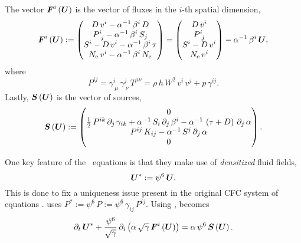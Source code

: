 The vector $\boldsymbol{F}^{i}\left(\boldsymbol{U}\right)$
is the vector of fluxes in the $i$-th spatial dimension,
\begin{equation}
  \boldsymbol{F}^{i}\left(\boldsymbol{U}\right)
  :=\begin{pmatrix}
  D\,v^{i}-\alpha^{-1}\,\beta^{i}\,D\\
  P^{i}_{~j}-\alpha^{-1}\,\beta^{i}\,S_{j}\\
  S^{i}-D\,v^{i}-\alpha^{-1}\,\beta^{i}\,\tau\\
  N_{\mathrm{e}}\,v^{i}-\alpha^{-1}\,\beta^{i}\,N_{\mathrm{e}}
  \end{pmatrix}
  =\begin{pmatrix}
  D\,v^{i}\\
  P^{i}_{~j}\\
  S^{i}-D\,v^{i}\\
  N_{\mathrm{e}}\,v^{i}
  \end{pmatrix}
  -\alpha^{-1}\,\beta^{i}\,\boldsymbol{U},
\end{equation}
where
\begin{equation}
  P^{ij}=\gamma^{i}_{~\mu}\,\gamma^{j}_{~\nu}\,T^{\mu\nu}
  =\rho\,h\,W^{2}\,v^{i}\,v^{j}+p\,\gamma^{ij}.
\end{equation}
Lastly, $\boldsymbol{S}\left(\boldsymbol{U}\right)$ is the vector of sources,
\begin{equation}
  \boldsymbol{S}\left(\boldsymbol{U}\right)
  :=\begin{pmatrix}
  0\\
  \frac{1}{2}\,P^{ik}\,\partial_{j}\,\gamma_{ik}
  +\alpha^{-1}\,S_{i}\,\partial_{j}\,\beta^{i}
  -\alpha^{-1}\,\left(\tau+D\right)\,\partial_{j}\,\alpha\\
  P^{ij}\,K_{ij}-\alpha^{-1}\,S^{j}\,\partial_{j}\,\alpha\\
  0
  \end{pmatrix}.
\end{equation}

One key feature of the \xcfc\ equations is that they make use of
{\sl densitized} fluid fields,
\begin{equation}
  \boldsymbol{U}^{*}:=\psi^{6}\,\boldsymbol{U}.
  \label{eq.xcfcDensitized}
\end{equation}
This is done to fix a uniqueness issue present in the original CFC system of
equations \citep[Eqs. (18), (26), and (35) in][]{wmm1996}.
 uses
$P^{*}:=\psi^{6}\,P:=\psi^{6}\,\gamma_{ij}\,P^{ij}$.
Using ,  becomes
\begin{equation}
  \partial_{t}\,\boldsymbol{U}^{*}
  +\frac{\psi^{6}}{\sqrt{\gamma}}\,
  \partial_{i}\left(\alpha\,\sqrt{\gamma}\,\boldsymbol{F}^{i}\left(\boldsymbol{U}\right)\right)
  =\alpha\,\psi^{6}\,\boldsymbol{S}\left(\boldsymbol{U}\right).
  \label{eq.consLaws2}
\end{equation}

